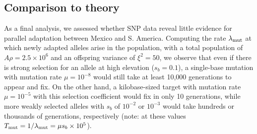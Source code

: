 {{%



\subsection*{Comparison to theory}


As a final analysis, we assessed whether  SNP data reveal little evidence for parallel adaptation between Mexico and S. America. Computing the rate $\lambda_{\text{mut}}$ at which newly adapted alleles arise in the population,
with a total population of $A \rho = 2.5 \times 10^6$ and an offspring variance of $\xi^2 = 50$,
we observe that even if there is strong selection for an allele at high elevation ($s_b=0.1$),
a single-base mutation with mutation rate $\mu=10^{-8}$ would still take at least 10,000 generations to appear and fix.
On the other hand, a kilobase-sized target with mutation rate $\mu=10^{-5}$
with this selection coefficient would fix in only 10 generations,
while more weakly selected alleles with $s_b$ of $10^{-2}$ or $10^{-3}$ would take hundreds or thousands of generations, respectively
(note: at these values $T_{\text{mut}} = 1/\lambda_{\text{mut}} = \mu s_b \times 10^5$).


}}
